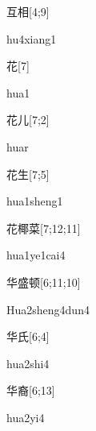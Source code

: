 \begin{verbete}[hu4xiang1]{互相}[4;9]
\begin{pronuncia}{hu4xiang1}
\end{pronuncia}
\end{verbete}

\begin{verbete}[hua1]{花}[7]
\begin{pronuncia}{hua1}
\end{pronuncia}
\end{verbete}

\begin{verbete}[huar1]{花儿}[7;2]
\begin{pronuncia}{huar}
\end{pronuncia}
\end{verbete}

\begin{verbete}{花生}[7;5]
\begin{pronuncia}{hua1sheng1}
\end{pronuncia}
\end{verbete}

\begin{verbete}{花椰菜}[7;12;11]
\begin{pronuncia}{hua1ye1cai4}
\end{pronuncia}
\end{verbete}

\begin{verbete}{华盛顿}[6;11;10]
\begin{pronuncia}[\\]{Hua2sheng4dun4}
\end{pronuncia}
\end{verbete}

\begin{verbete}{华氏}[6;4]
\begin{pronuncia}{hua2shi4}
\end{pronuncia}
\end{verbete}

\begin{verbete}[hua2yi4]{华裔}[6;13]
\begin{pronuncia}{hua2yi4}
\end{pronuncia}
\end{verbete}

